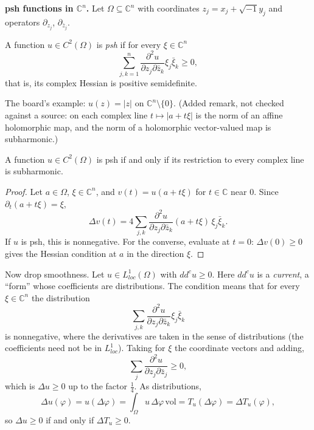 \medskip\noindent
{\bf psh functions in $\mathbb{C}^n$.} Let
$\Omega\subseteq\mathbb{C}^n$ with
coordinates $z_j=x_j+\sqrt{-1}y_j$ and
operators $\partial_{z_j}$,
$\partial_{\bar z_j}$.

\begin{definition}
\label{definition-psh-board}
A function $u\in C^2(\Omega)$ is \emph{psh}
if for every $\xi\in\mathbb{C}^n$
$$
\sum_{j,k=1}^n
\frac{\partial^2u}{\partial z_j
\partial\bar z_k}\xi_j\bar\xi_k\geq 0,
$$
that is, its complex Hessian is positive
semidefinite.
\end{definition}

\noindent
The board's example: $u(z)=|z|$ on
$\mathbb{C}^n\setminus\{0\}$. (Added remark, not
checked against a source: on each complex
line $t\mapsto|a+t\xi|$ is the norm of an
affine holomorphic map, and the norm of a
holomorphic vector-valued map is
subharmonic.)

\begin{proposition}
\label{proposition-psh-complex-lines}
A function $u\in C^2(\Omega)$ is psh if and
only if its restriction to every complex
line is subharmonic.
\end{proposition}

\begin{proof}
Let $a\in\Omega$, $\xi\in\mathbb{C}^n$, and
$v(t)=u(a+t\xi)$ for $t\in\mathbb{C}$ near
$0$. Since $\partial_t(a+t\xi)=\xi$,
$$
\Delta v(t)=4\sum_{j,k}
\frac{\partial^2u}{\partial z_j
\partial\bar z_k}(a+t\xi)\,
\xi_j\bar\xi_k.
$$
If $u$ is psh, this is nonnegative. For the
converse, evaluate at $t=0$: $\Delta
v(0)\geq 0$ gives the Hessian condition at
$a$ in the direction $\xi$.
\end{proof}

\noindent
Now drop smoothness. Let $u\in
L^1_{loc}(\Omega)$ with $dd^cu\geq 0$. Here
$dd^cu$ is a \emph{current}, a ``form'' whose
coefficients are distributions. The
condition means that for every
$\xi\in\mathbb{C}^n$ the distribution
$$
\sum_{j,k}
\frac{\partial^2u}{\partial z_j
\partial\bar z_k}\xi_j\bar\xi_k
$$
is nonnegative, where the derivatives are
taken in the sense of distributions (the
coefficients need not be in $L^1_{loc}$).
Taking for $\xi$ the coordinate vectors and
adding,
$$
\sum_j\frac{\partial^2u}{\partial z_j
\partial\bar z_j}\geq 0,
$$
which is $\Delta u\geq 0$ up to the factor
$\frac{1}{4}$. As distributions,
$$
\Delta u(\varphi)=u(\Delta\varphi)
=\int_\Omega u\,\Delta\varphi\,\mathrm{vol}
=T_u(\Delta\varphi)=\Delta T_u(\varphi),
$$
so $\Delta u\geq 0$ if and only if $\Delta
T_u\geq 0$.

